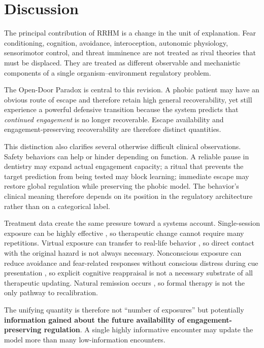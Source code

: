 \documentclass[11pt]{article}
\begin{document}
\section{Discussion}

The principal contribution of RRHM is a change in the unit of explanation. Fear conditioning, cognition, avoidance, interoception, autonomic physiology, sensorimotor control, and threat imminence are not treated as rival theories that must be displaced. They are treated as different observable and mechanistic components of a single organism--environment regulatory problem.

The Open-Door Paradox is central to this revision. A phobic patient may have an obvious route of escape and therefore retain high general recoverability, yet still experience a powerful defensive transition because the system predicts that \emph{continued engagement} is no longer recoverable. Escape availability and engagement-preserving recoverability are therefore distinct quantities.

This distinction also clarifies several otherwise difficult clinical observations. Safety behaviors can help or hinder depending on function. A reliable pause in dentistry may expand actual engagement capacity; a ritual that prevents the target prediction from being tested may block learning; immediate escape may restore global regulation while preserving the phobic model. The behavior's clinical meaning therefore depends on its position in the regulatory architecture rather than on a categorical label.

Treatment data create the same pressure toward a systems account. Single-session exposure can be highly effective \cite{odgers2022}, so therapeutic change cannot require many repetitions. Virtual exposure can transfer to real-life behavior \cite{morina2015}, so direct contact with the original hazard is not always necessary. Nonconscious exposure can reduce avoidance and fear-related responses without conscious distress during cue presentation \cite{siegel2025}, so explicit cognitive reappraisal is not a necessary substrate of all therapeutic updating. Natural remission occurs \cite{trumpf2009remission}, so formal therapy is not the only pathway to recalibration.

The unifying quantity is therefore not ``number of exposures'' but potentially \textbf{information gained about the future availability of engagement-preserving regulation}. A single highly informative encounter may update the model more than many low-information encounters.
\end{document}
